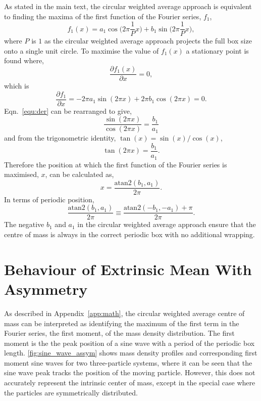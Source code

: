 \documentclass[reprint,superscriptaddress,nobibnotes,amsmath,amssymb,aip]{revtex4-2}
\begin{document}
As stated in the main text, the circular weighted average approach is equivalent to finding the maxima of the first function of the Fourier series, $f_1$,
%
\begin{equation}
    f_1(x) = a_1 \cos{\Big(2\pi\frac{1}{P} x\Big)} + b_1 \sin{\Big(2\pi\frac{1}{P} x\Big)},
\end{equation} 
%
where $P$ is $1$ as the circular weighted average approach projects the full box size onto a single unit circle. 
To maximise the value of $f_1(x)$ a stationary point is found where,
%
\begin{equation}
    \frac{\partial f_1(x)}{\partial x} = 0,
\end{equation}
%
which is 
%
\begin{equation}
    \frac{\partial f_1}{\partial x} = -2 \pi a_1 \sin( 2\pi x) + 2 \pi b_1 \cos( 2\pi x) = 0.
    \label{equ:der}
\end{equation}
%
Eqn.~\ref{equ:der} can be rearranged to give, 
%
\begin{equation}
\frac{\sin(2 \pi x)}{\cos(2 \pi x)} =  \frac{b_1}{a_1}
\end{equation}
%
and from the trigonometric identity, $\tan(x) = \sin(x) / \cos(x)$, 
%
\begin{equation}
    \tan(2 \pi x) = \frac{b_1}{a_1}.
\end{equation}
%
Therefore the position at which the first function of the Fourier series is maximised, $x$, can be calculated as, 
%
\begin{equation}
    x = \frac{\text{atan}2(b_1, a_1)}{2\pi}.
\end{equation}
%
In terms of periodic position, 
%
\begin{equation}
    \frac{\text{atan}2(b_1, a_1)}{2\pi} \equiv \frac{\text{atan}2(-b_1, -a_1) + \pi}{2\pi}.
\end{equation}
%
The negative $b_1$ and $a_1$ in the circular weighted average approach ensure that the centre of mass is always in the correct periodic box with no additional wrapping.

\section{Behaviour of Extrinsic Mean With Asymmetry}
\label{app:fourier}

As described in Appendix~\ref{app:math}, the circular weighted average centre of mass can be interpreted as identifying the maximum of the first term in the Fourier series, the first moment, of the mass density distribution. 
The first moment is the the peak position of a sine wave with a period of the periodic box length. 
\cref{fig:sine_wave_assym} shows mass density profiles and corresponding first moment sine waves for two three-particle systems, where it can be seen that the sine wave peak tracks the position of the moving particle. 
However, this does not accurately represent the intrinsic center of mass, except in the special case where the particles are symmetrically distributed. 
\end{document}
